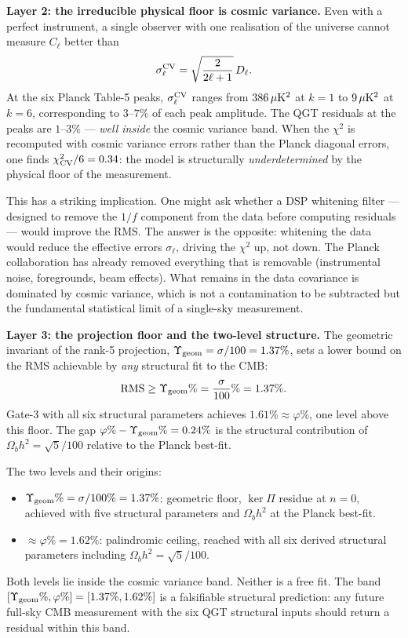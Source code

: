 \documentclass[twocolumn,10pt]{article}
\newcommand{\vp}{\varphi}
\begin{document}
\medskip
\noindent\textbf{Layer 2: the irreducible physical floor is cosmic variance.}
Even with a perfect instrument, a single observer with one realisation
of the universe cannot measure $C_\ell$ better than
\begin{equation}
  \sigma_\ell^{\rm CV} = \sqrt{\frac{2}{2\ell+1}}\,D_\ell.
  \label{eq:cosmic_variance}
\end{equation}
At the six Planck Table-5 peaks, $\sigma_\ell^{\rm CV}$ ranges
from $386\,\mu{\rm K}^2$ at $k=1$ to $9\,\mu{\rm K}^2$ at $k=6$,
corresponding to $3$--$7\%$ of each peak amplitude. The QGT
residuals at the peaks are $1$--$3\%$ --- \emph{well inside} the
cosmic variance band. When the $\chi^2$ is recomputed with cosmic
variance errors rather than the Planck diagonal errors, one finds
$\chi^2_{\rm CV}/6 = 0.34$: the model is structurally
\emph{underdetermined} by the physical floor of the measurement.

This has a striking implication. One might ask whether a DSP
whitening filter --- designed to remove the $1/f$ component from
the data before computing residuals --- would improve the RMS.
The answer is the opposite: whitening the data would reduce the
effective errors $\sigma_\ell$, driving the $\chi^2$ up, not down.
The Planck collaboration has already removed everything that is
removable (instrumental noise, foregrounds, beam effects). What
remains in the data covariance is dominated by cosmic variance,
which is not a contamination to be subtracted but the fundamental
statistical limit of a single-sky measurement.

\medskip
\noindent\textbf{Layer 3: the projection floor and the two-level structure.}
The geometric invariant of the rank-5 projection,
$\Upsilon_{\rm geom}=\sigma/100=1.37\%$, sets a lower bound on the
RMS achievable by \emph{any} structural fit to the CMB:
\begin{equation}
  \mathrm{RMS} \geq \Upsilon_{\rm geom}\% = \frac{\sigma}{100}\%
  = 1.37\%.
  \label{eq:rms_floor}
\end{equation}
Gate-3 with all six structural parameters achieves $1.61\%\approx\vp\%$,
one level above this floor. The gap $\vp\%-\Upsilon_{\rm geom}\%=0.24\%$
is the structural contribution of $\Omega_bh^2=\sqrt{5}/100$
relative to the Planck best-fit.

The two levels and their origins:
\begin{itemize}[nosep]
\item $\Upsilon_{\rm geom}\%=\sigma/100\%=1.37\%$: geometric floor,
  $\ker\Pi$ residue at $n=0$, achieved with five structural
  parameters and $\Omega_bh^2$ at the Planck best-fit.
\item $\approx\vp\%=1.62\%$: palindromic ceiling, reached with
  all six derived structural parameters including
  $\Omega_bh^2=\sqrt{5}/100$.
\end{itemize}
Both levels lie inside the cosmic variance band. Neither is a
free fit. The band $[\Upsilon_{\rm geom}\%,\vp\%]=[1.37\%,1.62\%]$
is a falsifiable structural prediction: any future full-sky CMB
measurement with the six QGT structural inputs should return a
residual within this band.
\end{document}
